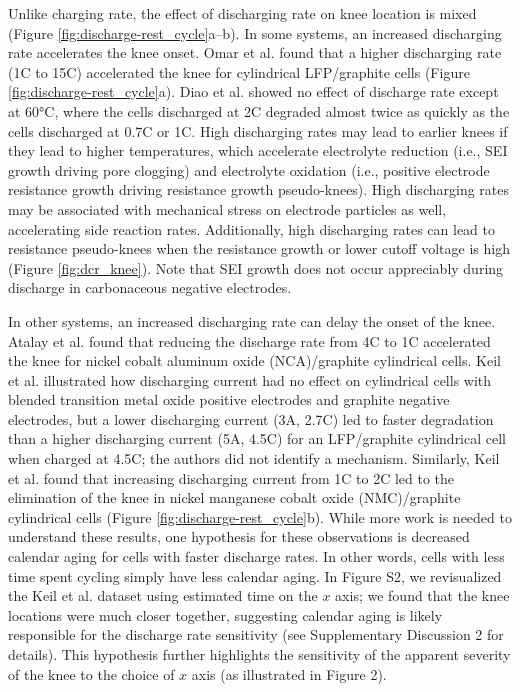 \documentclass[journal=jpclcd,manuscript=article]{achemso}
\begin{document}
Unlike charging rate, the effect of discharging rate on knee location is mixed (Figure \ref{fig:discharge-rest_cycle}a--b).
In some systems, an increased discharging rate
accelerates the knee onset.
Omar et al.\cite{omar_lithium_2014} found that a higher discharging rate (1C to 15C) accelerated the knee for cylindrical LFP/graphite cells (Figure \ref{fig:discharge-rest_cycle}a).
Diao et al.\cite{diao_accelerated_2019} showed no effect of discharge rate except at 60°C, where the cells discharged at 2C degraded almost twice as quickly as the cells discharged at 0.7C or 1C.
High discharging rates may lead to earlier knees if they lead to higher temperatures, which accelerate electrolyte reduction (i.e., SEI growth driving pore clogging) and electrolyte oxidation (i.e., positive electrode resistance growth driving resistance growth pseudo-knees).
High discharging rates may be associated with mechanical stress on electrode particles as well, accelerating side reaction rates.\cite{christensen_mathematical_2006, allen_quantifying_2021, dubarry_cell_2014, sun_accelerated_2018}
Additionally, high discharging rates can lead to resistance pseudo-knees when the resistance growth or lower cutoff voltage is high (Figure \ref{fig:dcr_knee}).\cite{ma_editors_2019, mandli_analysis_2019}
Note that SEI growth does not occur appreciably during discharge in carbonaceous negative electrodes\cite{attia_electrochemical_2019, das_electrochemical_2019}.

In other systems, an increased discharging rate can delay the onset of the knee.
Atalay et al.\cite{atalay_theory_2020} found that reducing the discharge rate from 4C to 1C accelerated the knee for nickel cobalt aluminum oxide (NCA)/graphite cylindrical cells.
Keil et al.\cite{keil_charging_2016} illustrated how discharging current had no effect on cylindrical cells with blended transition metal oxide positive electrodes and graphite negative electrodes, but a lower discharging current (3A, 2.7C) led to faster degradation than a higher discharging current (5A, 4.5C) for an LFP/graphite cylindrical cell when charged at 4.5C; the authors did not identify a mechanism. 
Similarly, Keil et al.\cite{keil_linear_2019} found that increasing discharging current from 1C to 2C led to the elimination of the knee in nickel manganese cobalt oxide (NMC)/graphite cylindrical cells (Figure \ref{fig:discharge-rest_cycle}b).
While more work is needed to understand these results, one hypothesis for these observations is decreased calendar aging for cells with faster discharge rates.
In other words, cells with less time spent cycling simply have less calendar aging. In Figure S2, we revisualized the Keil et al.\cite{keil_linear_2019} dataset using estimated time on the $x$ axis; we found that the knee locations were much closer together, suggesting calendar aging is likely responsible for the discharge rate sensitivity (see Supplementary Discussion 2 for details). This hypothesis further highlights the sensitivity of the apparent severity of the knee to the choice of $x$ axis (as illustrated in Figure 2).
\end{document}

